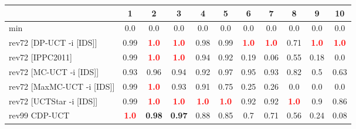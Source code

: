 \documentclass{article}
\begin{document}
\begin{tabular}{|l|r@{$\pm$}rr@{$\pm$}rr@{$\pm$}rr@{$\pm$}rr@{$\pm$}rr@{$\pm$}rr@{$\pm$}rr@{$\pm$}rr@{$\pm$}rr@{$\pm$}r|}
\hline

& \multicolumn{2}{c}{1}
& \multicolumn{2}{c}{2}
& \multicolumn{2}{c}{3}
& \multicolumn{2}{c}{4}
& \multicolumn{2}{c}{5}
& \multicolumn{2}{c}{6}
& \multicolumn{2}{c}{7}
& \multicolumn{2}{c}{8}
& \multicolumn{2}{c}{9}
& \multicolumn{2}{c|}{10}
\\
\hline
\hline
min
& \multicolumn{2}{c}{0.0}
& \multicolumn{2}{c}{0.0}
& \multicolumn{2}{c}{0.0}
& \multicolumn{2}{c}{0.0}
& \multicolumn{2}{c}{0.0}
& \multicolumn{2}{c}{0.0}
& \multicolumn{2}{c}{0.0}
& \multicolumn{2}{c}{0.0}
& \multicolumn{2}{c}{0.0}
& \multicolumn{2}{c|}{0.0}
\\
rev72 [DP-UCT -i [IDS]]
& \multicolumn{2}{c}{0.99}
& \multicolumn{2}{c}{\textbf{\textcolor{red}{1.0}}}
& \multicolumn{2}{c}{\textbf{\textcolor{red}{1.0}}}
& \multicolumn{2}{c}{0.98}
& \multicolumn{2}{c}{0.99}
& \multicolumn{2}{c}{\textbf{\textcolor{red}{1.0}}}
& \multicolumn{2}{c}{\textbf{\textcolor{red}{1.0}}}
& \multicolumn{2}{c}{0.71}
& \multicolumn{2}{c}{\textbf{\textcolor{red}{1.0}}}
& \multicolumn{2}{c|}{\textbf{\textcolor{red}{1.0}}}
\\
rev72 [IPPC2011]
& \multicolumn{2}{c}{0.99}
& \multicolumn{2}{c}{\textbf{\textcolor{red}{1.0}}}
& \multicolumn{2}{c}{\textbf{\textcolor{red}{1.0}}}
& \multicolumn{2}{c}{0.94}
& \multicolumn{2}{c}{0.92}
& \multicolumn{2}{c}{0.19}
& \multicolumn{2}{c}{0.06}
& \multicolumn{2}{c}{0.55}
& \multicolumn{2}{c}{0.18}
& \multicolumn{2}{c|}{0.0}
\\
rev72 [MC-UCT -i [IDS]]
& \multicolumn{2}{c}{0.93}
& \multicolumn{2}{c}{0.96}
& \multicolumn{2}{c}{0.94}
& \multicolumn{2}{c}{0.92}
& \multicolumn{2}{c}{0.97}
& \multicolumn{2}{c}{0.95}
& \multicolumn{2}{c}{0.93}
& \multicolumn{2}{c}{0.82}
& \multicolumn{2}{c}{0.5}
& \multicolumn{2}{c|}{0.63}
\\
rev72 [MaxMC-UCT -i [IDS]]
& \multicolumn{2}{c}{0.99}
& \multicolumn{2}{c}{\textbf{\textcolor{red}{1.0}}}
& \multicolumn{2}{c}{0.93}
& \multicolumn{2}{c}{0.91}
& \multicolumn{2}{c}{0.75}
& \multicolumn{2}{c}{0.25}
& \multicolumn{2}{c}{0.26}
& \multicolumn{2}{c}{0.0}
& \multicolumn{2}{c}{0.0}
& \multicolumn{2}{c|}{0.0}
\\
rev72 [UCTStar -i [IDS]]
& \multicolumn{2}{c}{0.99}
& \multicolumn{2}{c}{\textbf{\textcolor{red}{1.0}}}
& \multicolumn{2}{c}{\textbf{\textcolor{red}{1.0}}}
& \multicolumn{2}{c}{\textbf{\textcolor{red}{1.0}}}
& \multicolumn{2}{c}{\textbf{\textcolor{red}{1.0}}}
& \multicolumn{2}{c}{0.92}
& \multicolumn{2}{c}{0.92}
& \multicolumn{2}{c}{\textbf{\textcolor{red}{1.0}}}
& \multicolumn{2}{c}{0.9}
& \multicolumn{2}{c|}{0.86}
\\
\hline
rev99 CDP-UCT
& \multicolumn{2}{c}{\textbf{\textcolor{red}{1.0}}}
& \multicolumn{2}{c}{\textbf{0.98}}
& \multicolumn{2}{c}{\textbf{0.97}}
& \multicolumn{2}{c}{0.88}
& \multicolumn{2}{c}{0.85}
& \multicolumn{2}{c}{0.7}
& \multicolumn{2}{c}{0.71}
& \multicolumn{2}{c}{0.56}
& \multicolumn{2}{c}{0.24}
& \multicolumn{2}{c|}{0.08}
\\
\hline
\end{tabular}%
\end{document}
